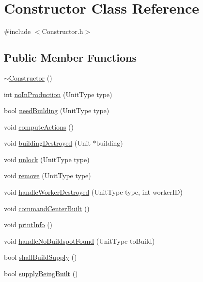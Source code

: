\hypertarget{class_constructor}{\section{Constructor Class Reference}
\label{class_constructor}
}


{\ttfamily \#include $<$Constructor.\-h$>$}

\subsection*{Public Member Functions}
\begin{DoxyCompactItemize}
\item 
\hyperlink{class_constructor_a4ad4d817192fadf79f16b2a4b72d86a9}{$\sim$\-Constructor} ()
\item 
int \hyperlink{class_constructor_a8dd09c6dfb18f97209f926ae7958c37f}{no\-In\-Production} (Unit\-Type type)
\item 
bool \hyperlink{class_constructor_a2883b7872bbd65c1cf18ba8a79a43449}{need\-Building} (Unit\-Type type)
\item 
void \hyperlink{class_constructor_a47a3a1ceff851d0e495c44366f98a432}{compute\-Actions} ()
\item 
void \hyperlink{class_constructor_a15307e790c25014ca22f40056e355d94}{building\-Destroyed} (Unit $\ast$building)
\item 
void \hyperlink{class_constructor_a05030bb1c079f9c152c39b48b470db5b}{unlock} (Unit\-Type type)
\item 
void \hyperlink{class_constructor_a9e10c2edbb0731a87ba8696f537598c2}{remove} (Unit\-Type type)
\item 
void \hyperlink{class_constructor_a85f3519c7db42db09edaa5e012ac3787}{handle\-Worker\-Destroyed} (Unit\-Type type, int worker\-I\-D)
\item 
void \hyperlink{class_constructor_aa1ecad48a8c4bd981e471e226a446a56}{command\-Center\-Built} ()
\item 
void \hyperlink{class_constructor_a256df62fe0b8c44f072f3403782c0b61}{print\-Info} ()
\item 
void \hyperlink{class_constructor_a2264d5f1dc4ff27c603c4616f8076920}{handle\-No\-Buildspot\-Found} (Unit\-Type to\-Build)
\item 
bool \hyperlink{class_constructor_a7549bd3bc6a41c7d8b0037f66fb7fd43}{shall\-Build\-Supply} ()
\item 
bool \hyperlink{class_constructor_ab148d682269935249336c2ac4809bc3a}{supply\-Being\-Built} ()

\end{DoxyCompactItemize}
